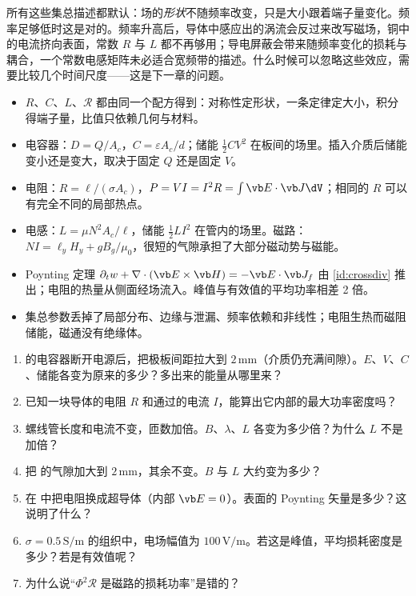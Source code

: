 所有这些集总描述都默认：场的\emph{形状}不随频率改变，只是大小跟着端子量变化。频率足够低时这是对的。频率升高后，导体中感应出的涡流会反过来改写磁场，铜中的电流挤向表面，常数 $R$ 与 $L$ 都不再够用；导电屏蔽会带来随频率变化的损耗与耦合，一个常数电感矩阵未必适合宽频带的描述。什么时候可以忽略这些效应，需要比较几个时间尺度——这是下一章的问题。

\begin{takeaways}
\begin{itemize}
\item $R$、$C$、$L$、$\mathcal R$ 都由同一个配方得到：对称性定形状，一条定律定大小，积分得端子量，比值只依赖几何与材料。
\item 电容器：$D=Q/A_c$，$C=\varepsilon A_c/d$；储能 $\tfrac12CV^2$ 在板间的场里。插入介质后储能变小还是变大，取决于固定 $Q$ 还是固定 $V$。
\item 电阻：$R=\ell/(\sigma A_c)$，$P=VI=I^2R=\int\vb E\cdot\vb J\dV$；相同的 $R$ 可以有完全不同的局部热点。
\item 电感：$L=\mu N^2A_c/\ell$，储能 $\tfrac12LI^2$ 在管内的场里。磁路：$NI=\ell_yH_y+gB_g/\mu_0$，很短的气隙承担了大部分磁动势与磁能。
\item Poynting 定理 $\partial_tw+\nabla\cdot(\vb E\times\vb H)=-\vb E\cdot\vb J_f$ 由 \eqref{id:crossdiv} 推出；电阻的热量从侧面经场流入。峰值与有效值的平均功率相差 2 倍。
\item 集总参数丢掉了局部分布、边缘与泄漏、频率依赖和非线性；电阻生热而磁阻储能，磁通没有绝缘体。
\end{itemize}
\end{takeaways}

\begin{selfcheck}
\begin{enumerate}
\item {} 的电容器断开电源后，把极板间距拉大到 $2\,\mathrm{mm}$（介质仍充满间隙）。$E$、$V$、$C$、储能各变为原来的多少？多出来的能量从哪里来？
\item 已知一块导体的电阻 $R$ 和通过的电流 $I$，能算出它内部的最大功率密度吗？
\item 螺线管长度和电流不变，匝数加倍。$B$、$\lambda$、$L$ 各变为多少倍？为什么 $L$ 不是加倍？
\item 把 的气隙加大到 $2\,\mathrm{mm}$，其余不变。$B$ 与 $L$ 大约变为多少？
\item 在 中把电阻换成超导体（内部 $\vb E=0$）。表面的 Poynting 矢量是多少？这说明了什么？
\item $\sigma=0.5\,\mathrm{S/m}$ 的组织中，电场幅值为 $100\,\mathrm{V/m}$。若这是峰值，平均损耗密度是多少？若是有效值呢？
\item 为什么说“$\Phi^2\mathcal R$ 是磁路的损耗功率”是错的？
\end{enumerate}
\end{selfcheck}


